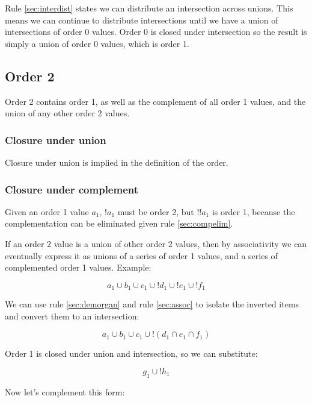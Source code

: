 \documentclass[letterpaper]{article}
\begin{document}
Rule \ref{sec:interdist} states we can distribute an intersection across
unions. This means we can continue to distribute intersections until
we have a union of intersections of order 0 values. Order 0 is closed under
intersection so the result is simply a union of order 0 values, which is order
1.

\subsection{Order 2}
Order 2 contains order 1, as well as the complement of all order 1 values, and
the union of any other order 2 values.

\subsubsection{Closure under union}

Closure under union is implied in the definition of the order.

\subsubsection{Closure under complement}

Given an order 1 value \(a_1\), \(!a_1\) must be order 2, but \(!!a_1\) is
order 1, because the complementation can be eliminated given rule
\ref{sec:compelim}.

If an order 2 value is a union of other order 2 values, then by associativity
we can eventually express it as unions of a series of order 1 values, and a
series of complemented order 1 values. Example:

\begin{equation}
a_1 \cup b_1 \cup c_1 \cup ! d_1 \cup ! e_1 \cup ! f_1
\end{equation}

We can use rule \ref{sec:demorgan} and rule \ref{sec:assoc} to isolate the
inverted items and convert them to an intersection:

\begin{equation}
a_1 \cup b_1 \cup c_1 \cup ! ( d_1 \cap  e_1 \cap  f_1 )
\end{equation}

Order 1 is closed under union and intersection, so we can substitute:

\begin{equation}
g_1 \cup ! h_1
\end{equation}

Now let's complement this form:
\end{document}
